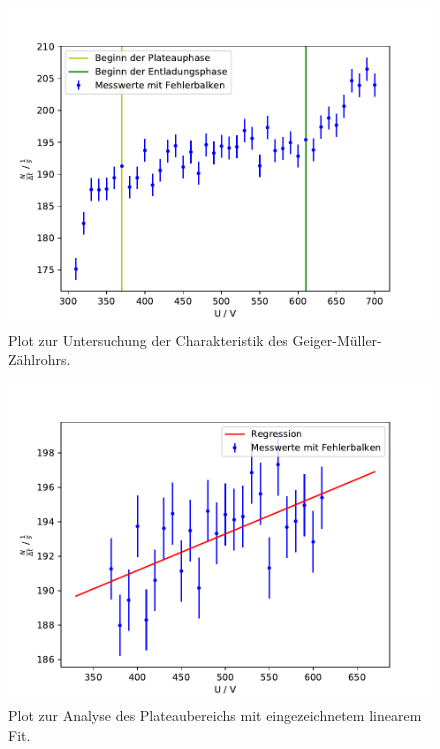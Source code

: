 \begin{figure}
  \centering
  \includegraphics[scale=0.7]{1.pdf}
  \caption{Plot zur Untersuchung der Charakteristik des Geiger-Müller-Zählrohrs.}
  \label{abb1}
\end{figure}
\FloatBarrier
\begin{figure}
  \centering
  \includegraphics[scale=0.7]{1b.pdf}
  \caption{Plot zur Analyse des Plateaubereichs mit eingezeichnetem linearem Fit.}
  \label{abb2}
\end{figure}
\FloatBarrier

